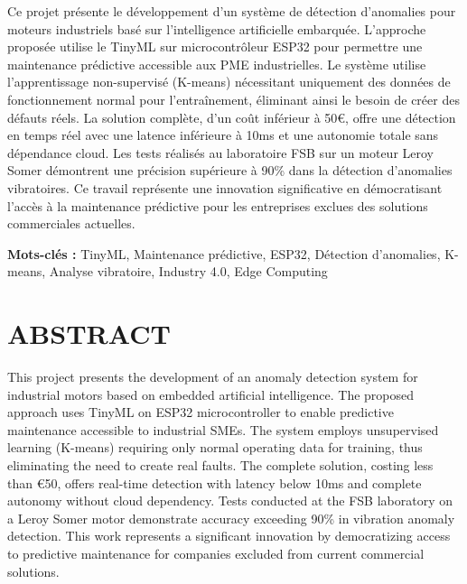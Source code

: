 \documentclass[oneside, french, a4paper, 12pt, reqno]{book}
\begin{document}
\begin{spacing}{1.3}
Ce projet présente le développement d'un système de détection d'anomalies pour moteurs industriels basé sur l'intelligence artificielle embarquée. L'approche proposée utilise le TinyML sur microcontrôleur ESP32 pour permettre une maintenance prédictive accessible aux PME industrielles. Le système utilise l'apprentissage non-supervisé (K-means) nécessitant uniquement des données de fonctionnement normal pour l'entraînement, éliminant ainsi le besoin de créer des défauts réels. La solution complète, d'un coût inférieur à 50€, offre une détection en temps réel avec une latence inférieure à 10ms et une autonomie totale sans dépendance cloud. Les tests réalisés au laboratoire FSB sur un moteur Leroy Somer démontrent une précision supérieure à 90\% dans la détection d'anomalies vibratoires. Ce travail représente une innovation significative en démocratisant l'accès à la maintenance prédictive pour les entreprises exclues des solutions commerciales actuelles.\\[0.5cm]
\end{spacing}

\vspace{0.5cm}
\noindent\textbf{Mots-clés :} TinyML, Maintenance prédictive, ESP32, Détection d'anomalies, K-means, Analyse vibratoire, Industry 4.0, Edge Computing

\chapter*{ABSTRACT}
\thispagestyle{plain}

\begin{spacing}{1.3}
This project presents the development of an anomaly detection system for industrial motors based on embedded artificial intelligence. The proposed approach uses TinyML on ESP32 microcontroller to enable predictive maintenance accessible to industrial SMEs. The system employs unsupervised learning (K-means) requiring only normal operating data for training, thus eliminating the need to create real faults. The complete solution, costing less than €50, offers real-time detection with latency below 10ms and complete autonomy without cloud dependency. Tests conducted at the FSB laboratory on a Leroy Somer motor demonstrate accuracy exceeding 90\% in vibration anomaly detection. This work represents a significant innovation by democratizing access to predictive maintenance for companies excluded from current commercial solutions.\\[0.5cm]
\end{spacing}
\end{document}
